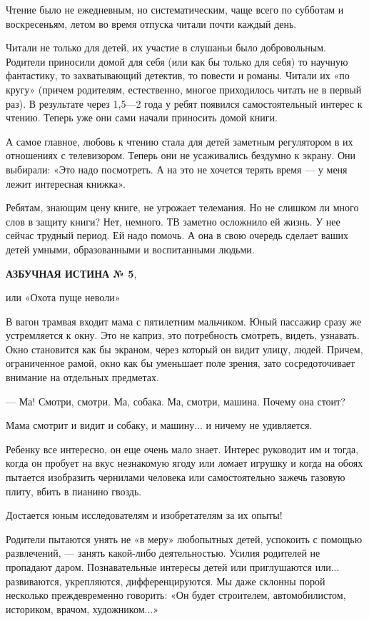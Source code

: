 \documentclass[12pt, a4paper, openany]{book}
\begin{document}
Чтение было не ежедневным, но систематическим, чаще всего по субботам и воскресеньям, летом во время отпуска читали почти каждый день.

Читали не только для детей, их участие в слушаньи было добровольным. Родители приносили домой для себя (или как бы только для себя) то научную фантастику, то захватывающий детектив, то повести и романы. Читали их «по кругу» (причем родителям, естественно, многое приходилось читать не в первый раз). В результате через 1,5—2 года у ребят появился самостоятельный интерес к чтению. Теперь уже они сами начали приносить домой книги. 

А самое главное, любовь к чтению стала для детей заметным регулятором в их отношениях с телевизором. Теперь они не усаживались бездумно к экрану. Они выбирали: «Это надо посмотреть. А на это не хочется терять время — у меня лежит интересная книжка». 

Ребятам, знающим цену книге, не угрожает телемания. Но не слишком ли много слов в защиту книги? Нет, немного. ТВ заметно осложнило ей жизнь. У нее сейчас трудный период. Ей надо помочь. А она в свою очередь сделает ваших детей умными, образованными и воспитанными людьми. 

\begin{center}
	\textbf{АЗБУЧНАЯ ИСТИНА № 5}, 

или «Охота пуще неволи» 
\end{center}

В вагон трамвая входит мама с пятилетним мальчиком. Юный пассажир сразу же устремляется к окну. Это не каприз, это потребность смотреть, видеть, узнавать. Окно становится как бы экраном, через который он видит улицу, людей. Причем, ограниченное рамой, окно как бы уменьшает поле зрения, зато сосредоточивает внимание на отдельных предметах. 

— Ма! Смотри, смотри. Ма, собака. Ма, смотри, машина. Почему она стоит? 

Мама смотрит и видит и собаку, и машину... и ничему не удивляется. 

Ребенку все интересно, он еще очень мало знает. Интерес руководит им и тогда, когда он пробует на вкус незнакомую ягоду или ломает игрушку и когда на обоях пытается изобразить чернилами человека или самостоятельно зажечь газовую плиту, вбить в пианино гвоздь. 

Достается юным исследователям и изобретателям за их опыты! 

Родители пытаются унять не «в меру» любопытных детей, успокоить с помощью развлечений, — занять какой-либо деятельностью. Усилия родителей не пропадают даром. Познавательные интересы детей или приглушаются или... развиваются, укрепляются, дифференцируются. Мы даже склонны порой несколько преждевременно говорить: «Он будет строителем, автомобилистом, историком, врачом, художником...» 
\end{document}
